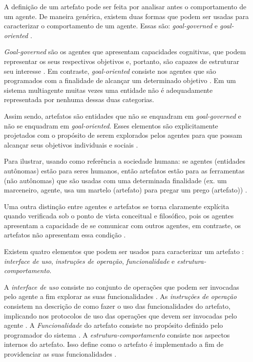 A definição de um artefato pode ser feita por analisar antes o comportamento de um agente. De maneira genérica, existem duas formas que podem ser usadas para caracterizar o comportamento de um agente. Essas são: \textit{goal-governed} e \textit{goal-oriented} \cite{relationwithagentprogram} \cite{programingagentartefact}.

\textit{Goal-governed} são os agentes que apresentam capacidades cognitivas, que podem representar os seus respectivos objetivos e, portanto, são capazes de estruturar seu interesse \cite{relationwithagentprogram} \cite{programingagentartefact}. Em contraste, \textit{goal-oriented} consiste nos agentes que são programados com a finalidade de alcançar um determinado objetivo \cite{relationwithagentprogram} \cite{programingagentartefact}. Em um sistema multiagente muitas vezes
uma entidade não é adequadamente representada por nenhuma dessas duas categorias. 

Assim sendo, artefatos são entidades que não se enquadram em  \textit{goal-governed} e não se enquadram em \textit{goal-oriented}. Esses elementos são explicitamente projetados com o propósito de serem explorados pelos agentes para que possam alcançar seus objetivos individuais e sociais \cite{programingagentartefact} \cite{cartago}. 

Para ilustrar, usando como referência a sociedade humana: se agentes (entidades autônomas) estão para seres humanos, então artefatos estão para as ferramentas (não autônomas) que são usadas com uma determinada finalidade (ex. um marceneiro, agente, usa um martelo (artefato) para pregar um prego (artefato)) \cite{programingagentartefact}.

Uma outra distinção entre agentes e artefatos se torna claramente explícita quando verificada sob o ponto de vista conceitual e filosófico, pois os agentes apresentam a capacidade de se comunicar com outros agentes, em contraste, os artefatos não apresentam essa condição \cite{programingagentartefact}.

Existem quatro elementos que podem ser usados para caracterizar um artefato \cite{programingagentartefact}: \textit{interface de uso}, \textit{instruções de operação}, \textit{funcionalidade} e \textit{estrutura-comportamento}.

A \textit{interface de uso} consiste no conjunto de operações que podem ser invocadas pelo agente a fim explorar as suas funcionalidades \cite{programingagentartefact}. As \textit{instruções de operação} consistem na descrição de como fazer o uso das funcionalidades do artefato, implicando nos protocolos de uso das operações que devem ser invocadas pelo agente \cite{programingagentartefact}. A \textit{Funcionalidade} do artefato consiste no propósito definido pelo programador do sistema \cite{programingagentartefact}. A \textit{estrutura-comportamento} consiste nos aspectos internos do artefato. Isso define como o artefato é implementado a fim de providenciar as suas funcionalidades \cite{programingagentartefact}.    

